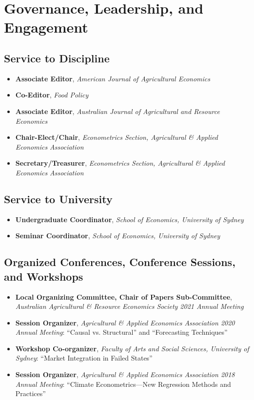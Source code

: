\documentclass[10pt]{article}
\begin{document}
	\bigskip
	
	\section*{Governance, Leadership, and Engagement}
	
	\subsection*{Service to Discipline}
	\begin{itemize}
		\item {} \textbf{Associate Editor}, \textsl{American Journal of Agricultural Economics}
		\item {} \textbf{Co-Editor}, \textsl{Food Policy}
		\item {} \textbf{Associate Editor}, \textsl{Australian Journal of Agricultural and Resource Economics}
		\item {} \textbf{Chair-Elect/Chair}, \textsl{Econometrics Section, Agricultural \& Applied Economics Association}
		\item {} \textbf{Secretary/Treasurer}, \textsl{Econometrics Section, Agricultural \& Applied Economics Association}
	\end{itemize}
	
	\subsection*{Service to University}
	\begin{itemize}
		\item {} \textbf{Undergraduate Coordinator}, \textsl{School of Economics, University of Sydney}
		\item {} \textbf{Seminar Coordinator}, \textsl{School of Economics, University of Sydney}
	\end{itemize}
	
	\subsection*{Organized Conferences, Conference Sessions, and Workshops}
	\begin{itemize}
		\item {} \textbf{Local Organizing Committee, Chair of Papers Sub-Committee}, \textsl{Australian Agricultural \& Resource Economics Society 2021 Annual Meeting}
		\item {} \textbf{Session Organizer}, \textsl{Agricultural \& Applied Economics Association 2020 Annual Meeting}: ``Causal vs. Structural'' and ``Forecasting Techniques''
		\item {} \textbf{Workshop Co-organizer}, \textsl{Faculty of Arts and Social Sciences, University of Sydney}: ``Market Integration in Failed States''
		\item {} \textbf{Session Organizer}, \textsl{Agricultural \& Applied Economics Association 2018 Annual Meeting}: ``Climate Econometrics---New Regression Methods and Practices''
	\end{itemize}
	
\end{document}
